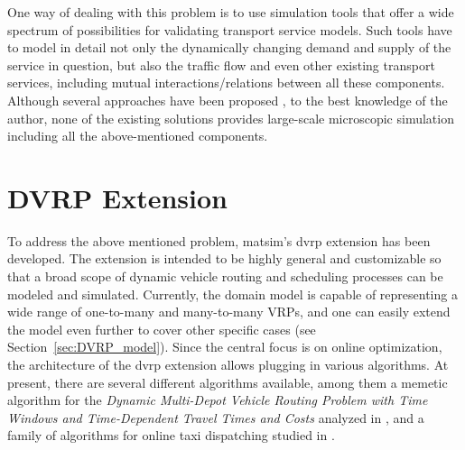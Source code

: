 One way of dealing with this problem is to use simulation tools that offer a wide spectrum of possibilities for validating transport service models. Such tools have to model in detail not only the dynamically changing demand and supply of the service in question, but also the traffic flow and even other existing transport services, including mutual interactions/relations between all these components. Although several approaches have been proposed \citep[e.g.,][]{ReganMahmassaniJaillet1998DynamicFleetManagementSimulation, BarceloEtc2007RoutingSchedulingSimulationLogistics, LiaoEtc2008ObjOrFramework4DVRP,Certicky:2014:AST:2615731.2616118}, to the best knowledge of the author, none of the existing solutions provides large-scale microscopic simulation including all the above-mentioned components.

\section{DVRP Extension}
To address the above mentioned problem, \gls{matsim}'s \gls{dvrp} extension has been developed. The extension is intended to be highly general and customizable so that a broad scope of dynamic vehicle routing and scheduling processes can be modeled and simulated. Currently, the domain model is capable of representing a wide range of one-to-many and many-to-many VRPs, and one can easily extend the model even further to cover other specific cases (see Section~\ref{sec:DVRP_model}). Since the central focus is on online optimization, the architecture of the \gls{dvrp} extension allows plugging in various algorithms. At present, there are several different algorithms available, among them a memetic  algorithm for the \emph{Dynamic Multi-Depot Vehicle Routing Problem with Time Windows and Time-Dependent Travel Times and Costs} analyzed in \citep{MaciejewskiNagel2012OfflineDVRPMATSimPPAM}, and a family of algorithms for online taxi dispatching studied in \citep{ MaciejewskiNagel2013TaxiSimulation, MaciejewskiNagel2013OnlineTaxisVSPWP, MaciejewskiNagel2013CooperationTaxiDispatching, Maciejewski2014OnlineViaOffline}.

